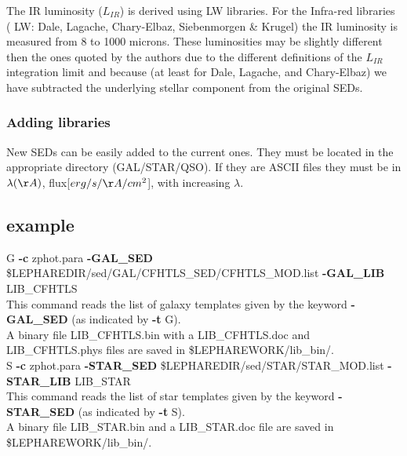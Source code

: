 \documentclass[12pt]{article}
\begin{document}
The IR luminosity ($L_{IR}$)  is derived using LW libraries. For the Infra-red libraries ( LW: Dale, Lagache, Chary-Elbaz, Siebenmorgen \& Krugel) the IR luminosity is measured from 8 to 1000 microns. These luminosities may be slightly different then the ones quoted by the authors due to the different definitions of the $L_{IR}$ integration limit and because (at least for Dale, Lagache, and Chary-Elbaz) we have subtracted the underlying stellar component from the original SEDs.\\

     

\subsubsection{Adding libraries}

New SEDs can be easily added to the current ones.
 They must be located in the appropriate directory (GAL/STAR/QSO).
  If they are ASCII files they must be in $\lambda(\AA)$, flux[$erg/s/\AA/cm^2$], with increasing $\lambda$.
    
  
  \subsection {example}
 
  
 G  {\bf -c} zphot.para {\bf -GAL\_SED}  \$LEPHAREDIR/sed/GAL/CFHTLS\_SED/CFHTLS\_MOD.list  {\bf -GAL\_LIB}  LIB\_CFHTLS  \\
  This command reads the list of galaxy templates given by the keyword {\bf -GAL\_SED}  (as indicated by {\bf -t} G).  \\
  A binary file LIB\_CFHTLS.bin with a LIB\_CFHTLS.doc and LIB\_CFHTLS.phys  files are saved in \$LEPHAREWORK/lib\_bin/. \\

 S {\bf -c} zphot.para {\bf -STAR\_SED}  \$LEPHAREDIR/sed/STAR/STAR\_MOD.list {\bf -STAR\_LIB}   LIB\_STAR \\
%
This command reads the list of star templates given by the keyword  {\bf -STAR\_SED}  (as indicated by {\bf -t} S). \\
A binary file  LIB\_STAR.bin and a  LIB\_STAR.doc file are saved in \$LEPHAREWORK/lib\_bin/. \\
  
\end{document}
